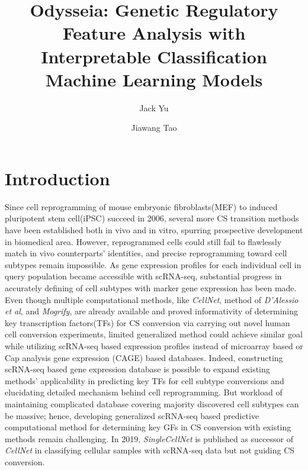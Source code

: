 \documentclass[fleqn,10pt]{wlscirep}
\title{Odysseia: Genetic Regulatory Feature Analysis with Interpretable Classification Machine Learning Models}
\author[1,*1]{Jack Yu}
\author[1,]{Jiawang Tao}
\affil[1]{Affiliation, department, city, postcode, country}
\affil[*1]{Correspondence: gyu17@alumni.jh.edu}
\begin{document}
\flushbottom
\maketitle
%
%
\thispagestyle{empty}
\section*{Introduction}
Since cell reprogramming of mouse embryonic fibroblasts(MEF) to induced pluripotent stem cell(iPSC) succeed in 2006\cite{yamanaka_2006}, several more CS transition methods have been established both in vivo and in vitro\cite{fibroblast_sertoli_2012,fibro_cardio_2012,mef_hept_2011}, spurring prospective development in biomedical area.
However, reprogrammed cells could still fail to flawlessly match in vivo counterparts' identities\cite{ASCL1_dopaminergic_neuron_2021}, and precise reprogramming toward cell subtypes remain impossible\cite{cell_repro_review}.
As gene expression profiles for each individual cell in query population became accessible with scRNA-seq, substantial progress in accurately defining of cell subtypes with marker gene expression has been made\cite{pancreas_subtypes_2016,lung_subtypes_2014}.
Even though multiple computational methods, like \emph{CellNet}\cite{cellnet_2014}, method of \emph{D’Alessio et al}\cite{dalessio_2015}, and \emph{Mogrify}\cite{mogrify_2016}, are already available and proved informativity of determining key transcription factors(TFs) for CS conversion via carrying out novel human cell conversion experiments, limited generalized method could achieve similar goal while utilizing scRNA-seq based expression profiles instead of microarray based or Cap analysis gene expression (CAGE) based databases.
Indeed, constructing scRNA-seq based gene expression database is possible to expand existing methods' applicability in predicting key TFs for cell subtype conversions and elucidating detailed mechanism behind cell reprogramming.
But workload of maintaining complicated database covering majority discovered cell subtypes can be massive; hence, developing generalized scRNA-seq based predictive computational method for determining key GFs in CS conversion with existing methods remain challenging.
In 2019, \emph{SingleCellNet}\cite{scn_2019} is published as successor of \emph{CellNet} in classifying cellular samples with scRNA-seq data but not guiding CS conversion.
\end{document}

